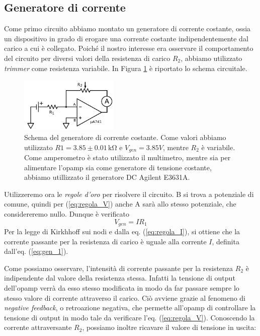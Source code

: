 \subsection{Generatore di corrente}

Come primo circuito abbiamo montato un generatore di corrente costante, ossia un dispositivo in grado di erogare una corrente costante indipendentemente dal carico a cui è collegato.
Poiché il nostro interesse era osservare il comportamento del circuito per diversi valori della resistenza di carico $R_2$, abbiamo utilizzato \textit{trimmer} come resistenza variabile. In Figura \ref{fig:gen_continua} è riportato lo schema circuitale.

\begin{figure}
  \begin{center}
    \includegraphics[width=0.42\textwidth]{../E01/latex/c1.pdf}
  \end{center}
  \caption{Schema del generatore di corrente costante. Come valori abbiamo utilizzato $R1=3.85 \pm 0.01 \,\si{\kilo\ohm}$ e $V_{gen}=3.85 V$, mentre $R_2$ è variabile. Come amperometro è stato utilizzato il multimetro, mentre sia per alimentare l'opamp sia come generatore di tensione costante, abbiamo utillizzato il generatore DC Agilent E3631A.}
\label{fig:gen_continua}
\end{figure}

Utilizzeremo ora le \textit{regole d'oro} per risolvere il circuito. B si trova a potenziale di comune, quindi per (\ref{eq:regola_V}) anche A sarà allo stesso potenziale, che considereremo nullo. Dunque è verificato
\begin{equation}
V_{gen}=I R_1
\label{eq:gen_1}
\end{equation}
Per la legge di Kirkhhoff sui nodi e dalla eq. (\ref{eq:regola_I}), si ottiene che la corrente passante per la resistenza di carico è uguale alla corrente $I$, definita dall'eq. (\ref{eq:gen_1}).

Come possiamo osservare, l'intensità di corrente passante per la resistenza $R_2$ è indipendente dal valore della resistenza stessa. Infatti la tensione di output dell'opamp verrà da esso stesso modificata in modo da far passare sempre lo stesso valore di corrente attraverso il carico.
Ciò avviene grazie al fenomeno di \textit{negative feedback}, o retroazione negativa, che permette all'opamp di controllare la tensione di output in modo tale da verificare l'eq. (\ref{eq:regola_V}).
Conoscendo la corrente attraversante $R_2$, possiamo inoltre ricavare il valore di tensione in uscita:

